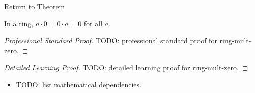 \newpage
{}
\label{prf:ring-mult-zero}

\begin{remark*}[Return]
\hyperref[prop:ring-mult-zero]{Return to Theorem}
\end{remark*}

\begin{proposition*}
In a ring, $a\cdot 0=0\cdot a=0$ for all $a$.
\end{proposition*}

\begin{proof}[Professional Standard Proof]
\LRAProofBodyStart
TODO: professional standard proof for ring-mult-zero.
\end{proof}

\begin{proof}[Detailed Learning Proof]
\LRAProofBodyStart
TODO: detailed learning proof for ring-mult-zero.
\end{proof}

\begin{remark*}
\end{remark*}

\begin{dependencies}
\begin{itemize}
  \item TODO: list mathematical dependencies.
\end{itemize}
\end{dependencies}

\clearpage
